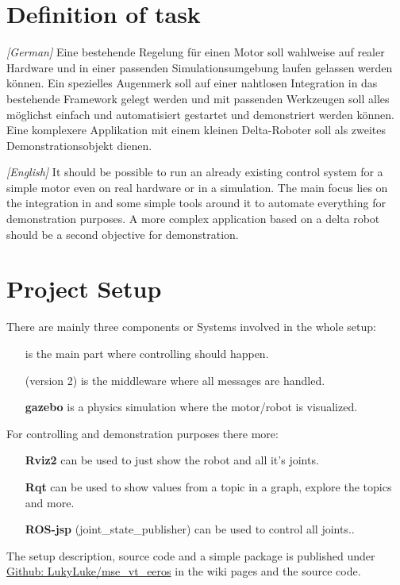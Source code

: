 
\section[Definition of task]{Definition of task}

\textit{[German]} Eine bestehende Regelung f\"ur einen Motor soll wahlweise auf realer Hardware und in einer passenden Simulationsumgebung laufen gelassen werden k\"onnen.
Ein spezielles Augenmerk soll auf einer nahtlosen Integration in das bestehende  Framework gelegt werden und mit passenden Werkzeugen soll alles m\"oglichst einfach und automatisiert gestartet und demonstriert werden k\"onnen.
Eine komplexere Applikation mit einem kleinen Delta-Roboter soll als zweites Demonstrationsobjekt dienen.

\textit{[English]} It should be possible to run an already existing control system for a simple motor even on real hardware or in a simulation.
The main focus lies on the integration in  and some simple tools around it to automate everything for demonstration purposes.
A more complex application based on a delta robot should be a second objective for demonstration.


\section[Setup]{Project Setup}

There are mainly three components or Systems involved in the whole setup:

\begin{itemize}
    \item[\textbf{\GLS{eeros}}] is the main part where controlling should happen.
    \item[\textbf{\GLS{ros}}] (version 2) is the middleware where all messages are handled.
    \item[\textbf{\Gls{gazebo}}] is a physics simulation where the motor/robot is visualized.
\end{itemize}

For controlling and demonstration purposes there more:

\begin{itemize}
    \item[\textbf{Rviz2}] can be used to just show the robot and all it's joints.
    \item[\textbf{Rqt}] can be used to show values from a topic in a graph, explore the topics and more.
    \item[\textbf{ROS-jsp}] (joint\_state\_publisher) can be used to control all joints..
\end{itemize}

The setup description, source code and a simple package is published under \href{https://github.com/LukyLuke/mse_vt_eeros}{Github: LukyLuke/mse\_vt\_eeros} in the wiki pages and the source code.
